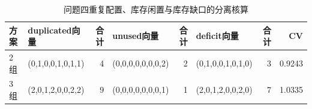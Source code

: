 \begin{table}[H]\centering\normalsize
\caption{问题四重复配置、库存闲置与库存缺口的分离核算}\label{tab:q4_resource_metrics}
\begin{tabular}{l>{\raggedright\arraybackslash}p{2.8cm}r>{\raggedright\arraybackslash}p{2.8cm}r>{\raggedright\arraybackslash}p{2.8cm}rr}
\toprule
方案 & duplicated向量 & 合计 & unused向量 & 合计 & deficit向量 & 合计 & CV\\\midrule
2组 & (0,1,0,0,1,0,1,1) & 4 & (0,0,0,0,0,0,0,2) & 2 & (0,1,0,0,1,0,1,0) & 3 & 0.9243\\
3组 & (2,0,1,2,0,0,2,2) & 9 & (0,0,0,0,0,0,0,1) & 1 & (2,0,1,2,0,0,2,0) & 7 & 1.0335\\
\bottomrule\end{tabular}
\end{table}

